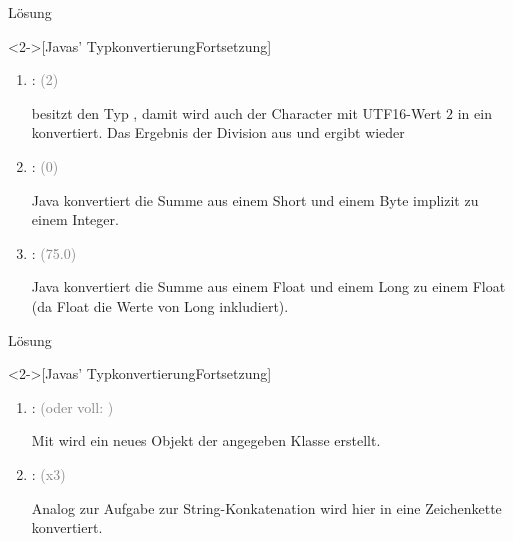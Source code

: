 \begin{frame}[c]{Lösung}
    \addtocounter{solve}{-1}%
    \begin{solve}<2->[Javas' Typkonvertierung\hfill{Fortsetzung}]
\pause\begin{enumerate}[<+(1)->]
    \widei
    \setcounter{enumi}{3}
    \item {}:  \textcolor{gray}{(2)}\pause\par
     besitzt den Typ , damit wird auch der Character mit UTF16-Wert \(2\) in ein  konvertiert. Das Ergebnis der Division aus  und  ergibt wieder 
    \item {}:  \textcolor{gray}{(0)}\pause\par
    Java konvertiert die Summe aus einem Short und einem Byte implizit zu einem Integer.
    \item {}:  \textcolor{gray}{(75.0)}\pause\par
    Java konvertiert die Summe aus einem Float und einem Long zu einem Float (da Float die Werte von Long inkludiert).
\end{enumerate}
    \end{solve}
\end{frame}

\begin{frame}[c]{Lösung}
    \addtocounter{solve}{-1}%
    \begin{solve}<2->[Javas' Typkonvertierung\hfill{Fortsetzung}]
\pause\begin{enumerate}[<+(1)->]
    \widei
    \setcounter{enumi}{6}
    \item {}:  \textcolor{gray}{(oder voll: )}\pause\par
    Mit  wird ein neues Objekt der angegeben Klasse erstellt.
    \item {}:  \textcolor{gray}{(x3)}\pause\par
    Analog zur Aufgabe zur String-Konkatenation wird hier  in eine Zeichenkette konvertiert.
\end{enumerate}
    \end{solve}
\end{frame}
\fi